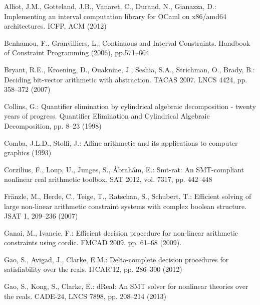 \documentclass[runningheads,a4paper,oribibl]{llncs}
\begin{document}

%
\begin{thebibliography}{10}
\providecommand{\url}[1]{\texttt{#1}}
\providecommand{\urlprefix}{URL }

Alliot, J.M., Gotteland, J.B., Vanaret, C., Durand, N., Gianazza, D.:
  {Implementing an interval computation library for OCaml on x86/amd64
  architectures}. {ICFP}, ACM (2012)

  Benhamou, F., Granvilliers, L.: {Continuous and Interval Constraints}.
  {Handbook of Constraint Programming} (2006), pp.571--604

  Bryant, R.E., Kroening, D., Ouaknine, J., Seshia, S.A., Strichman, O., Brady, B.:
  Deciding bit-vector arithmetic with abstraction. TACAS 2007.
  LNCS 4424, pp. 358--372 (2007)

  Collins, G.: Quantifier elimination by cylindrical algebraic decomposition
  - twenty years of progress. Quantifier Elimination and Cylindrical
  Algebraic Decomposition, pp. 8--23 (1998)

  
Comba, J.L.D., Stolfi, J.: Affine arithmetic and its applications to computer
  graphics (1993)

Corzilius, F., Loup, U., Junges, S., Ábrahám, E.: Smt-rat: An SMT-compliant
  nonlinear real arithmetic toolbox. SAT 2012, vol. 7317, pp. 442--448

Fränzle, M., Herde, C., Teige, T., Ratschan, S., Schubert, T.: Efficient
  solving of large non-linear arithmetic constraint systems with complex
  boolean structure. JSAT 1,  209--236 (2007)

Ganai, M., Ivancic, F.: Efficient decision procedure for non-linear arithmetic
  constraints using cordic.
  FMCAD 2009. pp. 61--68 (2009).

Gao, S., Avigad, J., Clarke, E.M.: Delta-complete decision procedures for
  satisfiability over the reals. IJCAR'12, pp. 286--300 (2012)

Gao, S., Kong, S., Clarke, E.: dReal: An SMT solver for nonlinear theories over
  the reals. CADE-24, LNCS 7898, pp. 208--214 (2013)


\end{thebibliography}
\end{document}
